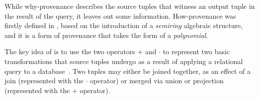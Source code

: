 While why-provenance describes the source tuples that witness an output tuple in the result of the query, it leaves out some information.
How-provenance was firstly defined in \citep{howProvenanceGreen}, based on the introduction of a \emph{semiring} algebraic structure, and it is a form of provenance that takes the form of a \emph{polynomial}.

The key idea of \cite{howProvenanceGreen} is to use the two operators $+$ and $\cdot$ to represent two basic transformations that source tuples undergo as a result of applying a relational query to a database~\citep{CheneyProvSurvey}. 
Two tuples may either be joined together, as an effect of a join (represented with the $\cdot$ operator) or merged via union or projection (represented with the $+$ operator).


